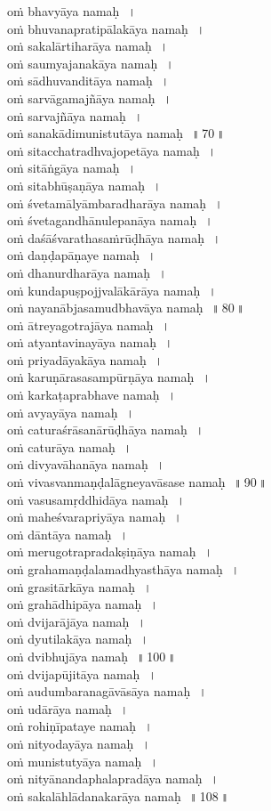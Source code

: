 \documentclass[parskip, DIV=14, pagenumber=head,top]{scrartcl}
\begin{document}
oṁ bhavyāya namaḥ\,~।\\
oṁ bhuvanapratipālakāya namaḥ\,~।\\
oṁ sakalārtiharāya namaḥ\,~।\\
oṁ saumyajanakāya namaḥ\,~।\\
oṁ sādhuvanditāya namaḥ\,~।\\
oṁ sarvāgamajñāya namaḥ\,~।\\
oṁ sarvajñāya namaḥ\,~।\\
oṁ sanakādimunistutāya namaḥ\,~॥\,70\,॥\\ 
oṁ sitacchatradhvajopetāya namaḥ\,~।\\
oṁ sitāṅgāya namaḥ\,~।\\
oṁ sitabhūṣaṇāya namaḥ\,~।\\
oṁ śvetamālyāmbaradharāya namaḥ\,~।\\
oṁ śvetagandhānulepanāya namaḥ\,~।\\
oṁ daśāśvarathasaṁrūḍhāya namaḥ\,~।\\
oṁ daṇḍapāṇaye namaḥ\,~।\\
oṁ dhanurdharāya namaḥ\,~।\\
oṁ kundapuṣpojjvalākārāya namaḥ\,~।\\
oṁ nayanābjasamudbhavāya namaḥ\,~॥\,80\,॥\\ 
oṁ ātreyagotrajāya namaḥ\,~।\\
oṁ atyantavinayāya namaḥ\,~।\\
oṁ priyadāyakāya namaḥ\,~।\\
oṁ karuṇārasasampūrṇāya namaḥ\,~।\\
oṁ karkaṭaprabhave namaḥ\,~।\\
oṁ avyayāya namaḥ\,~।\\
oṁ caturaśrāsanārūḍhāya namaḥ\,~।\\
oṁ caturāya namaḥ\,~।\\
oṁ divyavāhanāya namaḥ\,~।\\
oṁ vivasvanmaṇḍalāgneyavāsase namaḥ\,~॥\,90\,॥\\ 
oṁ vasusamṛddhidāya namaḥ\,~।\\
oṁ maheśvarapriyāya namaḥ\,~।\\
oṁ dāntāya namaḥ\,~।\\
oṁ merugotrapradakṣiṇāya namaḥ\,~।\\
oṁ grahamaṇḍalamadhyasthāya namaḥ\,~।\\
oṁ grasitārkāya namaḥ\,~।\\
oṁ grahādhipāya namaḥ\,~।\\
oṁ dvijarājāya namaḥ\,~।\\
oṁ dyutilakāya namaḥ\,~।\\
oṁ dvibhujāya namaḥ\,~॥\,100\,॥\\ 
oṁ dvijapūjitāya namaḥ\,~।\\
oṁ audumbaranagāvāsāya namaḥ\,~।\\
oṁ udārāya namaḥ\,~।\\
oṁ rohiṇīpataye namaḥ\,~।\\
oṁ nityodayāya namaḥ\,~।\\
oṁ munistutyāya namaḥ\,~।\\
oṁ nityānandaphalapradāya namaḥ\,~।\\
oṁ sakalāhlādanakarāya namaḥ\,~॥\,108\,॥\\ 
\end{document}
